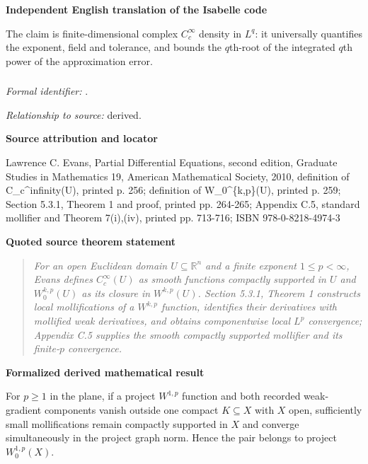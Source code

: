 \documentclass[10pt,oneside]{article}
\newenvironment{sourcequote}{\begin{quote}\itshape}{\end{quote}}
\newcommand{\reviewlabel}[1]{\par\smallskip\noindent\textsf{\bfseries #1}\par\smallskip}
\begin{document}
\reviewlabel{Independent English translation of the Isabelle code}
The claim is finite-dimensional complex $C_c^\infty$ density in $L^q$: it universally quantifies the exponent, field and tolerance, and bounds the $q$th-root of the integrated $q$th power of the approximation error.

\subsubsection{\texttt{}}
\noindent\textit{Formal identifier:} \texttt{}.\par
\noindent\textit{Relationship to source:} derived.

\reviewlabel{Source attribution and locator}
Lawrence C. Evans, Partial Differential Equations, second edition, Graduate Studies in Mathematics 19, American Mathematical Society, 2010, definition of C\_c\textasciicircum{}infinity(U), printed p. 256; definition of W\_0\textasciicircum{}\{k,p\}(U), printed p. 259; Section 5.3.1, Theorem 1 and proof, printed pp. 264-265; Appendix C.5, standard mollifier and Theorem 7(i),(iv), printed pp. 713-716; ISBN 978-0-8218-4974-3

\reviewlabel{Quoted source theorem statement}
\begin{sourcequote}
For an open Euclidean domain $U\subseteq\mathbb R^n$ and a finite exponent $1\leq p<\infty$, Evans defines $C_c^\infty(U)$ as smooth functions compactly supported in $U$ and $W_0^{k,p}(U)$ as its closure in $W^{k,p}(U)$. Section 5.3.1, Theorem 1 constructs local mollifications of a $W^{k,p}$ function, identifies their derivatives with mollified weak derivatives, and obtains componentwise local $L^p$ convergence; Appendix C.5 supplies the smooth compactly supported mollifier and its finite-$p$ convergence.
\end{sourcequote}

\reviewlabel{Formalized derived mathematical result}
For $p\geq1$ in the plane, if a project $W^{1,p}$ function and both recorded weak-gradient components vanish outside one compact $K\subseteq X$ with $X$ open, sufficiently small mollifications remain compactly supported in $X$ and converge simultaneously in the project graph norm. Hence the pair belongs to project $W^{1,p}_0(X)$.
\end{document}
